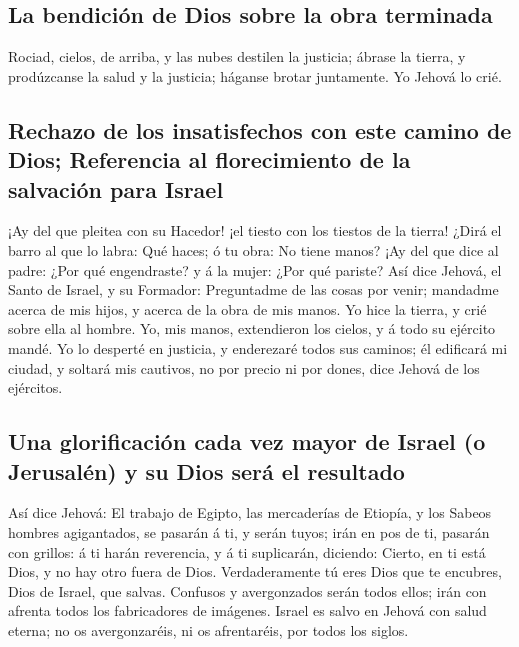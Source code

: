 \hypertarget{la-bendiciuxf3n-de-dios-sobre-la-obra-terminada}{%
\subsection{La bendición de Dios sobre la obra
terminada}\label{la-bendiciuxf3n-de-dios-sobre-la-obra-terminada}}

 Rociad, cielos, de arriba, y las nubes destilen la
justicia; ábrase la tierra, y prodúzcanse la salud y la justicia;
háganse brotar juntamente. Yo Jehová lo crié.

\hypertarget{rechazo-de-los-insatisfechos-con-este-camino-de-dios-referencia-al-florecimiento-de-la-salvaciuxf3n-para-israel}{%
\subsection{Rechazo de los insatisfechos con este camino de Dios;
Referencia al florecimiento de la salvación para
Israel}\label{rechazo-de-los-insatisfechos-con-este-camino-de-dios-referencia-al-florecimiento-de-la-salvaciuxf3n-para-israel}}

 ¡Ay del que pleitea con su Hacedor! ¡el tiesto con los
tiestos de la tierra! ¿Dirá el barro al que lo labra: Qué haces; ó tu
obra: No tiene manos?  ¡Ay del que dice al padre: ¿Por
qué engendraste? y á la mujer: ¿Por qué pariste?  Así
dice Jehová, el Santo de Israel, y su Formador: Preguntadme de las cosas
por venir; mandadme acerca de mis hijos, y acerca de la obra de mis
manos.  Yo hice la tierra, y crié sobre ella al hombre.
Yo, mis manos, extendieron los cielos, y á todo su ejército mandé.
 Yo lo desperté en justicia, y enderezaré todos sus
caminos; él edificará mi ciudad, y soltará mis cautivos, no por precio
ni por dones, dice Jehová de los ejércitos.

\hypertarget{una-glorificaciuxf3n-cada-vez-mayor-de-israel-o-jerusaluxe9n-y-su-dios-seruxe1-el-resultado}{%
\subsection{Una glorificación cada vez mayor de Israel (o Jerusalén) y
su Dios será el
resultado}\label{una-glorificaciuxf3n-cada-vez-mayor-de-israel-o-jerusaluxe9n-y-su-dios-seruxe1-el-resultado}}

 Así dice Jehová: El trabajo de Egipto, las mercaderías
de Etiopía, y los Sabeos hombres agigantados, se pasarán á ti, y serán
tuyos; irán en pos de ti, pasarán con grillos: á ti harán reverencia, y
á ti suplicarán, diciendo: Cierto, en ti está Dios, y no hay otro fuera
de Dios.  Verdaderamente tú eres Dios que te encubres,
Dios de Israel, que salvas.  Confusos y avergonzados
serán todos ellos; irán con afrenta todos los fabricadores de imágenes.
 Israel es salvo en Jehová con salud eterna; no os
avergonzaréis, ni os afrentaréis, por todos los siglos.

